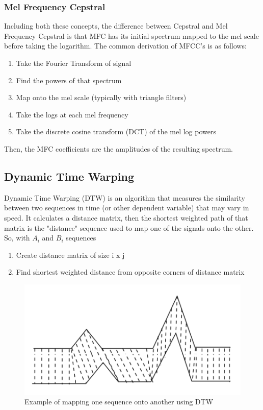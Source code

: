 \documentclass{article}
\begin{document}
\subsubsection{Mel Frequency Cepstral}
Including both these concepts, the difference between Cepstral and Mel Frequency Cepstral is that MFC has its initial spectrum mapped to the mel scale before taking the logarithm. The common derivation of MFCC's is as follows:

\begin{enumerate}
    \item Take the Fourier Transform of signal
    \item Find the powers of that spectrum
    \item Map onto the mel scale (typically with triangle filters)
    \item Take the logs at each mel frequency
    \item Take the discrete cosine transform (DCT) of the mel log powers
\end{enumerate}
\noindent
Then, the MFC coefficients are the amplitudes of the resulting spectrum.

\subsection{Dynamic Time Warping}
Dynamic Time Warping (DTW) is an algorithm that measures the similarity between two sequences in time (or other dependent variable) that may vary in speed. It calculates a distance matrix, then the shortest weighted path of that matrix is the "distance" sequence used to map one of the signals onto the other. So, with $A_i$ and $B_i$ sequences

\begin{enumerate}
    \item Create distance matrix of size i x j
    \item Find shortest weighted distance from opposite corners of distance matrix
\end{enumerate}

\begin{figure}[H]
    \centering
    \includegraphics[width=\linewidth]{dtw_image.png}
    \caption{Example of mapping one sequence onto another using DTW}
    \label{fig:dtw_map}
\end{figure}
\end{document}
